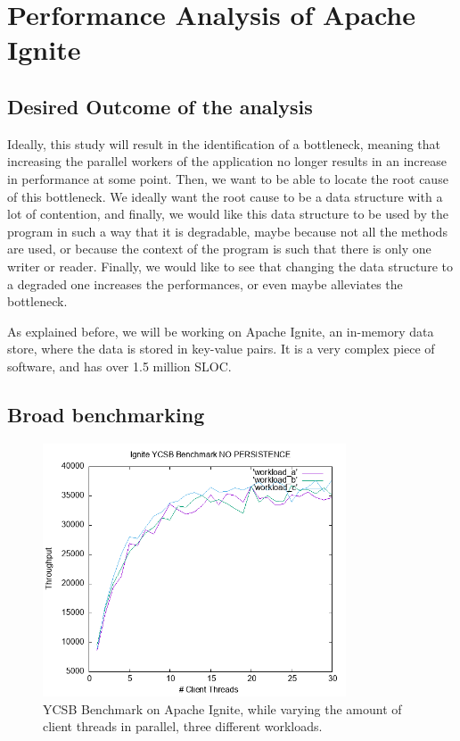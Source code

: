 \documentclass[conference]{IEEEtran}
\begin{document}
\bigbreak 

\section{Performance Analysis of Apache Ignite}
\subsection{Desired Outcome of the analysis}
Ideally, this study will result in the identification of a bottleneck, meaning that increasing the parallel workers of the application no longer results in an increase in performance at some point. Then, we want to be able to locate the root cause of this bottleneck. We ideally want the root cause to be a data structure with a lot of contention, and finally, we would like this data structure to be used by the program in such a way that it is degradable, maybe because not all the methods are used, or because the context of the program is such that there is only one writer or reader. Finally, we would like to see that changing the data structure to a degraded one increases the performances, or even maybe alleviates the bottleneck.

As explained before, we will be working on Apache Ignite, an in-memory data store, where the data is stored in key-value pairs. It is a very complex piece of software, and has over 1.5 million SLOC.


\subsection{Broad benchmarking}

\begin{figure}[!ht]
\centerline{\includegraphics[width=90mm]{coarse_grained.png}}
\caption{YCSB Benchmark on Apache Ignite, while varying the amount of client threads in parallel, three different workloads.}
\label{coarse_grained}
\end{figure}
\end{document}
